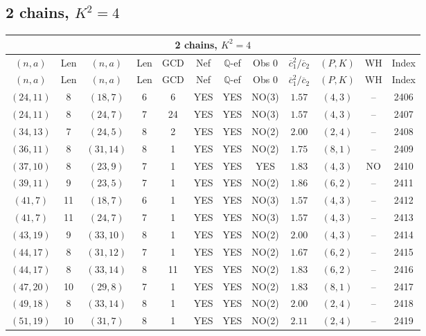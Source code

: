 \subsection{2 chains, $K^2 = 4$}
\begin{longtable}{|c|c|c|c|c|c|c|c|c|c|c|c|}
\hline
\multicolumn{12}{|c|}{2 chains, $K^2 = 4$}\\
\hline
$(n,a)$ & Len & $(n,a)$ & Len & GCD & Nef & $\mathbb Q$-ef & Obs 0 & $\overline c_1^2 / \overline c_2$ & $(P,K)$ & WH & Index\\
\hline
\endfirsthead

\hline
$(n,a)$ & Len & $(n,a)$ & Len & GCD & Nef & $\mathbb Q$-ef & Obs 0 & $\overline c_1^2 / \overline c_2$ & $(P,K)$ & WH & Index\\
\hline
\endhead
\hline
\endfoot

$(24,11)$ & 8 & $(18,7)$ & 6 & 6 & YES & YES & NO(3) & $1.57$ & $(4,3)$ & -- & 2406\\
$(24,11)$ & 8 & $(24,7)$ & 7 & 24 & YES & YES & NO(3) & $1.57$ & $(4,3)$ & -- & 2407\\
$(34,13)$ & 7 & $(24,5)$ & 8 & 2 & YES & YES & NO(2) & $2.00$ & $(2,4)$ & -- & 2408\\
$(36,11)$ & 8 & $(31,14)$ & 8 & 1 & YES & YES & NO(2) & $1.75$ & $(8,1)$ & -- & 2409\\
$(37,10)$ & 8 & $(23,9)$ & 7 & 1 & YES & YES & YES & $1.83$ & $(4,3)$ & NO & 2410\\
$(39,11)$ & 9 & $(23,5)$ & 7 & 1 & YES & YES & NO(2) & $1.86$ & $(6,2)$ & -- & 2411\\
$(41,7)$ & 11 & $(18,7)$ & 6 & 1 & YES & YES & NO(3) & $1.57$ & $(4,3)$ & -- & 2412\\
$(41,7)$ & 11 & $(24,7)$ & 7 & 1 & YES & YES & NO(3) & $1.57$ & $(4,3)$ & -- & 2413\\
$(43,19)$ & 9 & $(33,10)$ & 8 & 1 & YES & YES & NO(2) & $2.00$ & $(4,3)$ & -- & 2414\\
$(44,17)$ & 8 & $(31,12)$ & 7 & 1 & YES & YES & NO(2) & $1.67$ & $(6,2)$ & -- & 2415\\
$(44,17)$ & 8 & $(33,14)$ & 8 & 11 & YES & YES & NO(2) & $1.83$ & $(6,2)$ & -- & 2416\\
$(47,20)$ & 10 & $(29,8)$ & 7 & 1 & YES & YES & NO(2) & $1.83$ & $(8,1)$ & -- & 2417\\
$(49,18)$ & 8 & $(33,14)$ & 8 & 1 & YES & YES & NO(2) & $2.00$ & $(2,4)$ & -- & 2418\\
$(51,19)$ & 10 & $(31,7)$ & 8 & 1 & YES & YES & NO(2) & $2.11$ & $(2,4)$ & -- & 2419\\

\end{longtable}
